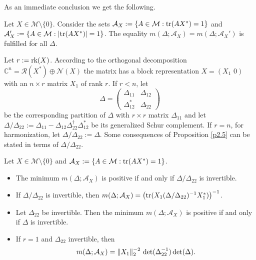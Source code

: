 \documentclass{amsart}
\begin{document}
As an immediate conclusion we get the following.

\begin{cor} \label{c2.6}
    Let $X \in {\mathcal M} \setminus \{ 0 \}$. Consider the sets ${\mathcal A}_X:= \{ A\in {\mathcal M} : {\rm tr}(A X^*) = 1 \}$ and ${{\mathcal A}_X':= \{ A\in {\mathcal M} : |{\rm tr}(A X^*)| = 1 \}}$. 
    The equality $m(\Delta;{\mathcal A}_X) = m(\Delta;{\mathcal A}_X')$ is fulfilled for all $\Delta$.
\end{cor}

Let $r:={\rm rk}(X)$. According to the orthogonal decomposition ${\mathbb C}^n = {\mathcal R}(X^*) \oplus {\mathcal N}(X)$ the matrix has a block representation $X = (X_1 \,\, 0)$ with an $n\times r$ matrix $X_1$ of rank $r$. If $r < n$, let
\[ 
   \Delta = \left(\begin{array}{cc}
               \Delta_{11} & \Delta_{12} \\
               \Delta_{12}^{*} & \Delta_{22}
   \end{array}\right)  
\]
be the corresponding partition of $\Delta$ with $r\times r$ matrix $\Delta_{11}$ and let
$\Delta/\Delta_{22}:=\Delta_{11} - \Delta_{12}\Delta_{22}^{\dagger}\Delta_{12}^*$ be its generalized Schur complement. If $r = n$, for harmonization, let $\Delta/\Delta_{22}:=\Delta$. Some consequences of Proposition \ref{p2.5} can be stated in terms of $\Delta/\Delta_{22}$.


\begin{cor} \label{c2.7}
    Let $X \in {\mathcal M} \setminus \{ 0 \}$ and ${\mathcal A}_X:= \{ A\in {\mathcal M} : {\rm tr}(A X^*) = 1 \}$.
\begin{itemize}
   \item[(i)] The minimum $m(\Delta;{\mathcal A}_X)$ is positive if and only if $\Delta/\Delta_{22}$ is invertible.
   \item[(ii)] If $\Delta/\Delta_{22}$ is invertible, then $m(\Delta;{\mathcal A}_X) = \bigl({\rm tr}(X_1 (\Delta/\Delta_{22})^{-1} X_1^*) \bigr)^{-1}$.
   \item[(iii)] Let $\Delta_{22}$ be invertible. Then the minimum $m(\Delta;{\mathcal A}_X)$ is positive if and only if $\Delta$ is invertible.
   \item[(iv)] If $r=1$ and $\Delta_{22}$ invertible, then
    \begin{equation} \label{f2.8}
         m(\Delta;{\mathcal A}_X) =  \|X_1\|_2^{-2} \, \det (\Delta_{22}^{-1}) \, {\rm det}(\Delta) .
\end{equation}
\end{itemize}
\end{cor}
\end{document}
